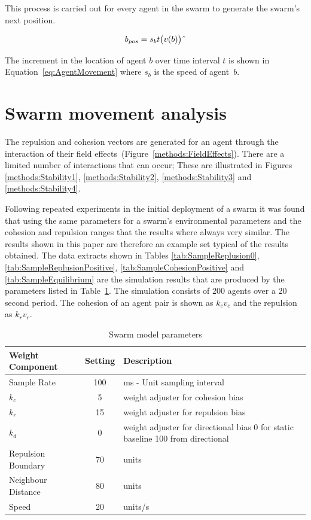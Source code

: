 \documentclass{ieeeaccess}
\begin{document}
This process is carried out for every agent in the swarm to generate the swarm's next position.

\begin{center}
\begin{equation}
\label{eq:AgentMovement}
b_{pos}=s_{b}t\big(v(b)\big)\string^ 
\end{equation}
\end{center}

The increment in the location of agent $b$ over time interval $t$ is shown in Equation~\ref{eq:AgentMovement} where $s_b$ is the speed of agent~$b$.

\section{Swarm movement analysis\label{metric:MagnitudeDynamics2}}
The repulsion and cohesion vectors are generated for an agent through the interaction of their field effects~(Figure~\ref{methods:FieldEffects}). There are a limited number of interactions that can occur; These are illustrated in Figures \ref{methods:Stability1}, \ref{methods:Stability2}, \ref{methods:Stability3} and \ref{methods:Stability4}.

Following repeated experiments in the initial deployment of a swarm it was found that using the same parameters for a swarm's environmental parameters and the cohesion and repulsion ranges that the results where always very similar. The results shown in this paper are therefore an example set typical of the results obtained. The data extracts shown in Tables \ref{tab:SampleReplusion0}, \ref{tab:SampleReplusionPositive}, \ref{tab:SampleCohesionPositive} and  \ref{tab:SampleEquilibrium} are the simulation results that are produced by the parameters listed in Table~\ref{tab:MetricPhysics1}. The simulation consists of 200 agents over a 20 second period. The cohesion of an agent pair is shown as $k_cv_c$ and the repulsion as $k_rv_r$.

\begin{table}[H]
\begin{center}
\begin{tabular}{| p{2.5cm} | c | p{3cm} |}
\hline
\bf Weight \bf Component & \bf Setting & \bf Description \\ \hline
Sample Rate & 100 & ms - Unit sampling interval\\  \hline
$k_c$ & 5 & weight adjuster for cohesion bias\\  \hline
$k_r$ & 15 & weight adjuster for repulsion  bias\\  \hline
$k_d$ & 0 & weight adjuster for directional bias 0 for static baseline 100 from directional\\  \hline
Repulsion Boundary & 70 & units\\  \hline
Neighbour Distance & 80 & units\\  \hline
Speed & 20 & units/s\\  \hline
\end{tabular}\caption{Swarm model parameters} \label{tab:MetricPhysics1}
\end{center}
\end{table}
\end{document}
